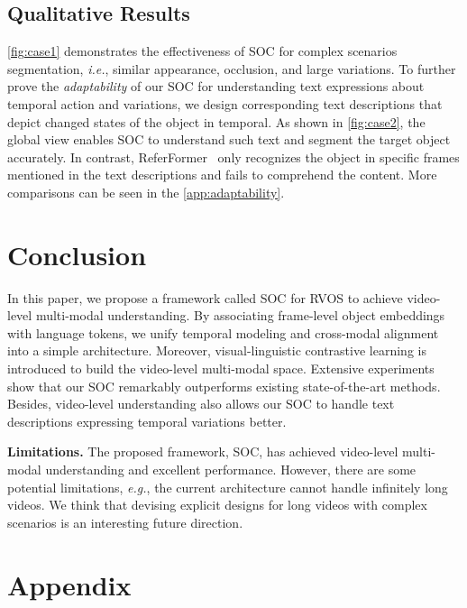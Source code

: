 \documentclass{article}
\begin{document}
\subsection{Qualitative Results}
\cref{fig:case1} demonstrates the effectiveness of SOC for complex scenarios segmentation, \textit{i.e.}, similar appearance, occlusion, and large variations. 
To further prove the \textit{adaptability} of our SOC for understanding text expressions about temporal action and variations, we design corresponding text descriptions that depict changed states of the object in temporal. 
As shown in \cref{fig:case2}, the global view enables SOC to understand such text  and segment the target object accurately. In contrast, ReferFormer~\cite{referformer} only recognizes the object in specific frames mentioned in the text descriptions and fails to comprehend the content.  More comparisons can be seen in the \cref{app:adaptability}.   


\section{Conclusion}
In this paper, we propose a framework called SOC for RVOS to achieve video-level multi-modal understanding. By associating frame-level object embeddings with language tokens, we unify temporal modeling and cross-modal alignment into a simple architecture. Moreover, visual-linguistic contrastive learning is introduced to build the video-level multi-modal space. Extensive experiments show that our SOC remarkably outperforms existing state-of-the-art methods. 
Besides, video-level understanding also allows our SOC to handle text descriptions expressing temporal variations better.


\textbf{Limitations.} The proposed framework, SOC, has achieved video-level multi-modal understanding and excellent performance. However, there are some potential limitations, \textit{e.g.}, the current architecture cannot handle infinitely long videos. We think that devising explicit designs for long videos with complex scenarios is an interesting future direction.




{


}



\newpage
\appendix

\section*{Appendix}
\end{document}
